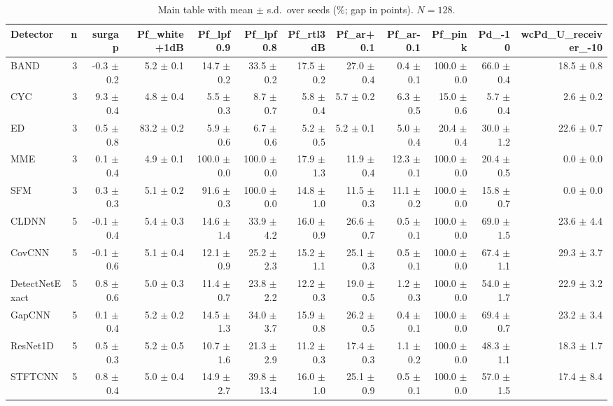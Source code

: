\begin{table}[t]
\centering
\caption{Main table with mean $\pm$ s.d.\ over seeds (\%; gap in points). $N=128$.}
\label{tab:supp-main}
\scriptsize
\setlength{\tabcolsep}{2pt}
\begin{tabular}{lrrrrrrrrrrr}
\toprule
Detector & n & surgap & Pf\_white+1dB & Pf\_lpf0.9 & Pf\_lpf0.8 & Pf\_rtl3dB & Pf\_ar+0.1 & Pf\_ar-0.1 & Pf\_pink & Pd\_-10 & wcPd\_U\_receiver\_-10 \\
\midrule
BAND & 3 & -0.3 $\pm$ 0.2 & 5.2 $\pm$ 0.1 & 14.7 $\pm$ 0.2 & 33.5 $\pm$ 0.2 & 17.5 $\pm$ 0.2 & 27.0 $\pm$ 0.4 & 0.4 $\pm$ 0.1 & 100.0 $\pm$ 0.0 & 66.0 $\pm$ 0.4 & 18.5 $\pm$ 0.8 \\
CYC & 3 & 9.3 $\pm$ 0.4 & 4.8 $\pm$ 0.4 & 5.5 $\pm$ 0.3 & 8.7 $\pm$ 0.7 & 5.8 $\pm$ 0.4 & 5.7 $\pm$ 0.2 & 6.3 $\pm$ 0.5 & 15.0 $\pm$ 0.6 & 5.7 $\pm$ 0.4 & 2.6 $\pm$ 0.2 \\
ED & 3 & 0.5 $\pm$ 0.8 & 83.2 $\pm$ 0.2 & 5.9 $\pm$ 0.6 & 6.7 $\pm$ 0.6 & 5.2 $\pm$ 0.5 & 5.2 $\pm$ 0.1 & 5.0 $\pm$ 0.4 & 20.4 $\pm$ 0.4 & 30.0 $\pm$ 1.2 & 22.6 $\pm$ 0.7 \\
MME & 3 & 0.1 $\pm$ 0.4 & 4.9 $\pm$ 0.1 & 100.0 $\pm$ 0.0 & 100.0 $\pm$ 0.0 & 17.9 $\pm$ 1.3 & 11.9 $\pm$ 0.4 & 12.3 $\pm$ 0.1 & 100.0 $\pm$ 0.0 & 20.4 $\pm$ 0.5 & 0.0 $\pm$ 0.0 \\
SFM & 3 & 0.3 $\pm$ 0.3 & 5.1 $\pm$ 0.2 & 91.6 $\pm$ 0.3 & 100.0 $\pm$ 0.0 & 14.8 $\pm$ 1.0 & 11.5 $\pm$ 0.3 & 11.1 $\pm$ 0.2 & 100.0 $\pm$ 0.0 & 15.8 $\pm$ 0.7 & 0.0 $\pm$ 0.0 \\
CLDNN & 5 & -0.1 $\pm$ 0.4 & 5.4 $\pm$ 0.3 & 14.6 $\pm$ 1.4 & 33.9 $\pm$ 4.2 & 16.0 $\pm$ 0.9 & 26.6 $\pm$ 0.7 & 0.5 $\pm$ 0.1 & 100.0 $\pm$ 0.0 & 69.0 $\pm$ 1.5 & 23.6 $\pm$ 4.4 \\
CovCNN & 5 & -0.1 $\pm$ 0.6 & 5.1 $\pm$ 0.4 & 12.1 $\pm$ 0.9 & 25.2 $\pm$ 2.3 & 15.2 $\pm$ 1.1 & 25.1 $\pm$ 0.3 & 0.5 $\pm$ 0.1 & 100.0 $\pm$ 0.0 & 67.4 $\pm$ 1.1 & 29.3 $\pm$ 3.7 \\
DetectNetExact & 5 & 0.8 $\pm$ 0.6 & 5.0 $\pm$ 0.3 & 11.4 $\pm$ 0.7 & 23.8 $\pm$ 2.2 & 12.2 $\pm$ 0.3 & 19.0 $\pm$ 0.5 & 1.2 $\pm$ 0.3 & 100.0 $\pm$ 0.0 & 54.0 $\pm$ 1.7 & 22.9 $\pm$ 3.2 \\
GapCNN & 5 & 0.1 $\pm$ 0.4 & 5.2 $\pm$ 0.2 & 14.5 $\pm$ 1.3 & 34.0 $\pm$ 3.7 & 15.9 $\pm$ 0.8 & 26.2 $\pm$ 0.5 & 0.4 $\pm$ 0.1 & 100.0 $\pm$ 0.0 & 69.4 $\pm$ 0.7 & 23.2 $\pm$ 3.4 \\
ResNet1D & 5 & 0.5 $\pm$ 0.3 & 5.2 $\pm$ 0.5 & 10.7 $\pm$ 1.6 & 21.3 $\pm$ 2.9 & 11.2 $\pm$ 0.3 & 17.4 $\pm$ 0.3 & 1.1 $\pm$ 0.2 & 100.0 $\pm$ 0.0 & 48.3 $\pm$ 1.1 & 18.3 $\pm$ 1.7 \\
STFTCNN & 5 & 0.8 $\pm$ 0.4 & 5.0 $\pm$ 0.4 & 14.9 $\pm$ 2.7 & 39.8 $\pm$ 13.4 & 16.0 $\pm$ 1.0 & 25.1 $\pm$ 0.9 & 0.5 $\pm$ 0.1 & 100.0 $\pm$ 0.0 & 57.0 $\pm$ 1.5 & 17.4 $\pm$ 8.4 \\
\bottomrule
\end{tabular}
\end{table}

